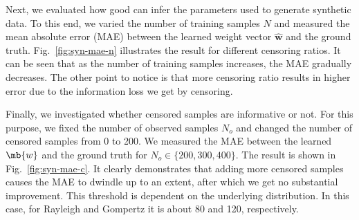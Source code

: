 Next, we evaluated how good \npglm can infer the parameters used to generate synthetic data. To this end, we varied the number of training samples $N$ and measured the mean absolute error (MAE) between the learned weight vector $\hat{\mathbf{w}}$ and the ground truth. Fig.~\ref{fig:syn-mae-n} illustrates the result for different censoring ratios. It can be seen that as the number of training samples increases, the MAE gradually decreases. The other point to notice is that more censoring ratio results in higher error due to the information loss we get by censoring.



Finally, we investigated whether censored samples are informative or not. For this purpose, we fixed the number of observed samples $N_o$ and changed the number of censored samples from 0 to 200. We measured the MAE between the learned $\mb{w}$ and the ground truth for $N_o\in\{200,300,400\}$. The result is shown in Fig.~\ref{fig:syn-mae-c}. It clearly demonstrates that adding more censored samples causes the MAE to dwindle up to an extent, after which we get no substantial improvement. This threshold is dependent on the underlying distribution. In this case, for Rayleigh and Gompertz it is about 80 and 120, respectively.


